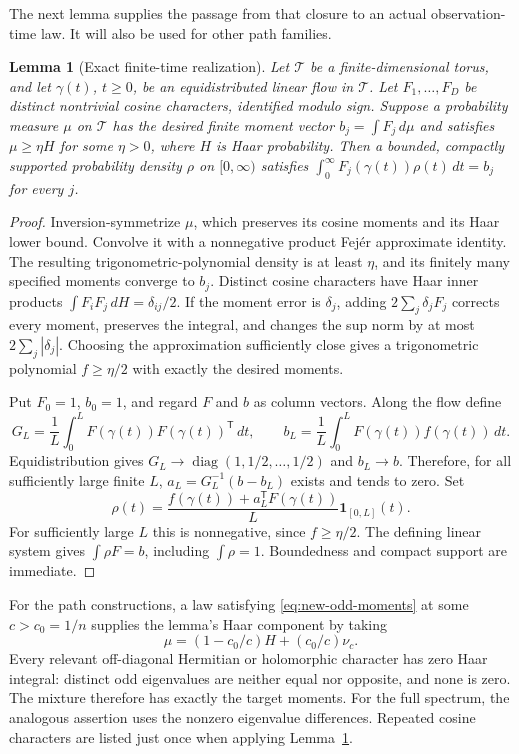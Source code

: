 \documentclass[11pt,a4paper]{article}
\newtheorem{lemma}[theorem]{Lemma}
\theoremstyle{definition}\newtheorem{definition}[theorem]{Definition}
\theoremstyle{remark}\newtheorem{remark}[theorem]{Remark}
\begin{document}
The next lemma supplies the passage from that closure to an actual
observation-time law. It will also be used for other path families.

\begin{lemma}[Exact finite-time realization]\label{lem:exact-finite-time}
Let $\mathcal T$ be a finite-dimensional torus, and let
$\gamma(t)$, $t\geq0$, be an equidistributed linear flow in $\mathcal T$.
Let $F_1,\ldots,F_D$ be distinct nontrivial cosine characters, identified
modulo sign. Suppose a probability measure $\mu$ on $\mathcal T$ has the
desired finite moment vector $b_j=\int F_j\,d\mu$ and satisfies
$\mu\geq\eta H$ for some $\eta>0$, where $H$ is Haar probability.
Then a bounded, compactly supported probability density $\rho$ on
$[0,\infty)$ satisfies
$\int_0^\infty F_j(\gamma(t))\rho(t)\,dt=b_j$ for every $j$.
\end{lemma}
\begin{proof}
Inversion-symmetrize $\mu$, which preserves its cosine moments and its
Haar lower bound. Convolve it with a nonnegative product Fej\'er
approximate identity. The resulting trigonometric-polynomial density
is at least $\eta$, and its finitely many specified moments converge to
$b_j$. Distinct cosine characters have Haar inner products
$\int F_iF_j\,dH=\delta_{ij}/2$. If the moment error is $\delta_j$,
adding $2\sum_j\delta_jF_j$ corrects every moment, preserves the
integral, and changes the sup norm by at most $2\sum_j|\delta_j|$.
Choosing the approximation sufficiently close gives a trigonometric
polynomial $f\geq\eta/2$ with exactly the desired moments.

Put $F_0=1$, $b_0=1$, and regard $F$ and $b$ as column vectors.
Along the flow define
\[
 G_L=\frac1L\int_0^L F(\gamma(t))F(\gamma(t))^{\mathsf T}\,dt,
 \qquad b_L=\frac1L\int_0^L F(\gamma(t))f(\gamma(t))\,dt.
\]
Equidistribution gives
$G_L\to\operatorname{diag}(1,1/2,\ldots,1/2)$ and $b_L\to b$.
Therefore, for all sufficiently large finite $L$,
$a_L=G_L^{-1}(b-b_L)$ exists and tends to zero. Set
\[
 \rho(t)=\frac{f(\gamma(t))+a_L^{\mathsf T}F(\gamma(t))}{L}
             \mathbf1_{[0,L]}(t).
\]
For sufficiently large $L$ this is nonnegative, since $f\geq\eta/2$.
The defining linear system gives $\int\rho F=b$, including
$\int\rho=1$. Boundedness and compact support are immediate.
\end{proof}

For the path constructions, a law satisfying \eqref{eq:new-odd-moments}
at some $c>c_0=1/n$ supplies the lemma's Haar component by taking
\begin{equation}\label{eq:new-haar-mix}
 \mu=(1-c_0/c)H+(c_0/c)\nu_c.
\end{equation}
Every relevant off-diagonal Hermitian or holomorphic character has
zero Haar integral: distinct odd eigenvalues are neither equal nor
opposite, and none is zero. The mixture therefore has exactly the
target moments. For the full spectrum, the analogous assertion uses
the nonzero eigenvalue differences. Repeated cosine characters are
listed just once when applying Lemma~\ref{lem:exact-finite-time}.
\end{document}
